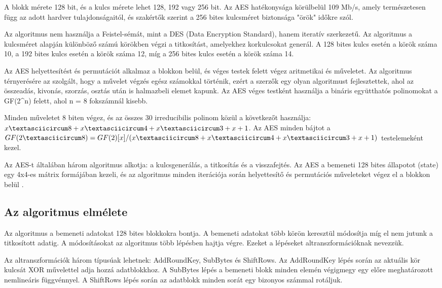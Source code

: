 A blokk mérete 128 bit, és a kulcs mérete lehet 128, 192 vagy 256 bit. Az AES hatékonysága körülbelül 109 Mb/s, amely természetesen függ az adott hardver tulajdonságaitól, és szakértők szerint a 256 bites kulcsméret biztonsága "örök" időkre szól.

Az algoritmus nem használja a Feistel-sémát, mint a DES (Data Encryption Standard), hanem iteratív szerkezetű. Az algoritmus a kulcsméret alapján különböző számú körökben végzi a titkosítást, amelyekhez korkulcsokat generál. A 128 bites kulcs esetén a körök száma 10, a 192 bites kulcs esetén a körök száma 12, míg a 256 bites kulcs esetén a körök száma 14.

Az AES helyettesítést és permutációt alkalmaz a blokkon belül, és véges testek felett végez aritmetikai és műveletet. Az algoritmus térnyerésére az szolgált, hogy a művelet végzés egész számokkal történik, ezért a szerzők egy olyan algoritmust fejlesztettek, ahol az összeadás, kivonás, szorzás, osztás után is halmazbeli elemet kapunk. Az AES véges testként használja a bináris együtthatós polinomokat a GF(2\textasciicircum n) felett, ahol n = 8 fokszámnál kisebb.

Minden műveletet 8 biten végez, és az összes 30 irreducibilis polinom közül a következőt használja: $x\textasciicircum 8 + x\textasciicircum 4 + x\textasciicircum 3 + x + 1$. Az AES minden bájtot a $GF(2\textasciicircum 8) = GF(2)[x]/(x\textasciicircum 8 + x\textasciicircum 4 + x\textasciicircum 3 + x + 1)$ testelemeként kezel.

Az AES-t általában három algoritmus alkotja: a kulcsgenerálás, a titkosítás és a visszafejtés. Az AES a bemeneti 128 bites állapotot (state) egy 4x4-es mátrix formájában kezeli, és az algoritmus minden iterációja során helyettesítő és permutációs műveleteket végez el a blokkon belül \cite{Marton}.

\subsection {Az algoritmus elmélete}

Az algoritmus a bemeneti adatokat 128 bites blokkokra bontja. A bemeneti adatokat több körön keresztül módosítja míg el nem jutunk a titkosított adatig. A módosításokat az algoritmus több lépésben hajtja végre. Ezeket a lépéseket altranszformációknak nevezzük.

Az altranszformációk három típusúak lehetnek: AddRoundKey, SubBytes és ShiftRows. Az AddRoundKey lépés során az aktuális kör kulcsát XOR művelettel adja hozzá adatblokkhoz. A SubBytes lépés a bemeneti blokk minden elemén végigmegy egy előre meghatározott nemlineáris függvénnyel. A ShiftRows lépés során az adatblokk minden sorát egy bizonyos számmal rotáljuk.

